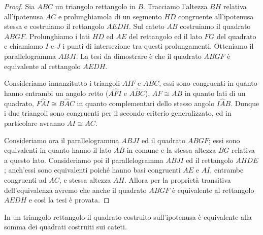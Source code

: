\noindent\begin{minipage}{0.63\textwidth}\parindent15pt
\begin{proof}
Sia $ABC$ un triangolo rettangolo in $B$. Tracciamo l'altezza $BH$ 
relativa all'ipotenusa $AC$ e prolunghiamola di un segmento $HD$ 
congruente all'ipotenusa stessa e costruiamo il rettangolo $AEDH$. 
Sul cateto $AB$ costruiamo il quadrato $ABGF$. Prolunghiamo i lati 
$HD$ ed $AE$ del rettangolo ed il lato $FG$ del quadrato e chiamiamo 
$I$ e $J$ i punti di intersezione tra questi prolungamenti. Otteniamo 
il parallelogramma $ABJI$.
La tesi da dimostrare è che il quadrato $ABGF$ è equivalente al 
rettangolo $AEDH$.

Consideriamo innanzitutto i triangoli $AIF$ e $ABC$, essi sono 
congruenti in quanto hanno entrambi un angolo retto ($A\widehat{F}I$ 
e $A\widehat{B}C$), $AF\cong AB$ in quanto lati di un quadrato, 
$F\widehat{A}I\cong B\widehat{A}C$ in quanto complementari dello 
stesso angolo $I\widehat{A}B$.
Dunque i due triangoli sono congruenti per il secondo criterio 
generalizzato, ed in particolare avranno $AI\cong AC$.

Consideriamo ora il parallelogramma $ABJI$ ed il quadrato $ABGF$; 
essi sono equivalenti in quanto hanno il lato $AB$ in comune e la 
stessa altezza $BG$ relativa a questo lato. 
Consideriamo poi il parallelogramma $ABJI$ ed il rettangolo $AHDE$; 
anch'essi sono equivalenti poiché hanno basi congruenti $AE$ e $AI$, 
entrambe congruenti ad $AC$, e stessa altezza $AH$.
Allora per la proprietà transitiva dell'equivalenza avremo che anche 
il quadrato $ABGF$ è equivalente al rettangolo $AEDH$ e così la tesi 
è provata.
\end{proof}
\end{minipage}\hfil
\begin{minipage}{0.37\textwidth}
  \centering
\end{minipage}\vspace{8pt}


\begin{teorema}[di Pitagora]
In un triangolo rettangolo il quadrato costruito sull'ipotenusa è 
equivalente alla somma dei quadrati costruiti sui cateti.
\end{teorema}

